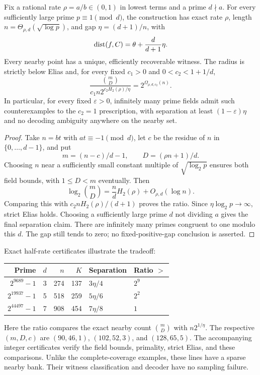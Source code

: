 \begin{corollary}
\label{ou:asymptotic}
Fix a rational rate $\rho=a/b\in(0,1)$ in lowest terms and a prime
$d\nmid a$. For every sufficiently large prime $p\equiv1\pmod d$,
the construction has exact rate $\rho$, length
$n=\Theta_{\rho,d}(\sqrt{\log p})$, and gap $\eta=(d+1)/n$, with
\[
 \operatorname{dist}(f,C)=\theta+\frac d{d+1}\eta.
\]
Every nearby point has a unique, efficiently recoverable witness.
The radius is strictly below Elias and, for every fixed $c_1>0$ and
$0<c_2<1+1/d$,
\[
 \frac{\binom mD}{c_1n2^{c_2H_2(\rho)/\eta}}
 =2^{\Omega_{\rho,d,c_2}(n)}.
\]
In particular, for every fixed $\varepsilon>0$, infinitely many prime
fields admit such counterexamples to the $c_2=1$ prescription, with separation at least
$(1-\varepsilon)\eta$ and no decoding ambiguity anywhere on the nearby set.
\end{corollary}
\begin{proof}
Take $n=bt$ with $at\equiv-1\pmod d$, let $c$ be the residue of $n$
in $\{0,\ldots,d-1\}$, and put
\[
 m=(n-c)/d-1,\qquad D=(\rho n+1)/d.
\]
Choosing $n$ near a sufficiently small constant multiple of
$\sqrt{\log_2p}$ ensures both field bounds, with $1\le D<m$ eventually.
Then
\[
 \log_2\binom mD=\frac{n}{d}H_2(\rho)+O_{\rho,d}(\log n).
\]
Comparing this with $c_2nH_2(\rho)/(d+1)$ proves the ratio. Since
$\eta\log_2p\to\infty$, strict Elias holds. Choosing a sufficiently
large prime $d$ not dividing $a$ gives the final separation claim.
There are infinitely many primes congruent to one modulo this $d$.
The gap still tends to zero; no fixed-positive-gap conclusion is asserted.
\end{proof}

Exact half-rate certificates illustrate the tradeoff:
\begin{center}
\begin{tabular}{@{}rrrrll@{}}
\toprule
Prime & $d$ & $n$ & $K$ & Separation & Ratio $>$\\
\midrule
$2^{9689}-1$&3&274&137&$3\eta/4$&$2^9$\\
$2^{19937}-1$&5&518&259&$5\eta/6$&$2^2$\\
$2^{44497}-1$&7&908&454&$7\eta/8$&$1$\\
\bottomrule
\end{tabular}
\end{center}
Here the ratio compares the exact nearby count $\binom mD$ with
$n2^{1/\eta}$. The respective $(m,D,c)$ are $(90,46,1)$,
$(102,52,3)$, and $(128,65,5)$. The accompanying integer certificates
verify the field bounds, primality, strict Elias, and these comparisons.
Unlike the complete-coverage examples, these lines have a sparse nearby
bank. Their witness classification and decoder have no sampling failure.



